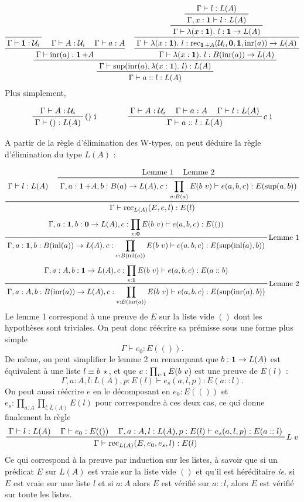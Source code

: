 \documentclass[../../rapport.tex]{subfiles}
\begin{document}
  $$
    \prfinterspace=1.2em
    \prftree
      {\prftree
	{\prftree
	  {\prfaxiom{\Gamma \vdash \1 : \U_i}}
	  {\Gamma \vdash A : \U_i}
	  {\Gamma \vdash a : A}
	{\Gamma \vdash \inr(a) : \1 + A}}
	{\prftree
	  {\prftree
	    {\prftree
	      {\prftree
		{\Gamma \vdash l : L(A)}
	      {\Gamma, x : \1 \vdash l : L(A)}}
	    {\Gamma \vdash \lambda(x:\1).\ l : \1 \fun L(A)}}
	  {\Gamma \vdash \lambda(x:\1).\ l : \rec_{\1 + A}(\U_i, \0, \1, \inr(a)) \fun L(A)}}
	{\Gamma \vdash \lambda(x:\1).\ l : B(\inr(a)) \fun L(A)}}
      {\Gamma \vdash \sup(\inr(a), \lambda(x:\1).\ l) : L(A)}}
    {\Gamma \vdash a :: l : L(A)}
  $$
  Plus simplement,

  $$\prfinterspace=1.2em
  \begin{array}{cc}
    \prftree[r]{$()$ i}{\Gamma \vdash A : \U_i}{\Gamma \vdash () : L(A)} \hspace{1cm}
    & \prftree[r]{$c$ i}{\Gamma \vdash A : \U_i}{\Gamma \vdash a : A}{\Gamma \vdash l : L(A)}{\Gamma \vdash a :: l : L(A)}
  \end{array}$$

  A partir de la règle d'élimination des W-types, on peut déduire la règle d'élimination du type $L(A)$ :

  $$\prfinterspace=1.2em
  \prftree
    {\Gamma \vdash l : L(A)}
    {\prftree
      {\text{Lemme 1}}
      {\text{Lemme 2}}
    {\Gamma, a : \1 + A, b : B(a) \fun L(A), c : \prod_{v:B(a)}E(b\ v) \vdash e(a, b, c) : E(\sup(a, b))}}
  {\Gamma \vdash \rec_{L(A)}(E, e, l) : E(l)}
  \vspace{1em}
  $$
  $$\prfinterspace=1.2em
  \prftree[r]{Lemme 1}
    {\Gamma, a : \1, b : \0 \fun L(A), c : \prod_{v:\0}E(b\ v) \vdash e(a, b, c) : E(())}
  {\Gamma, a : \1, b : B(\inl(a)) \fun L(A), c : \prod_{v:B(\inl(a))}E(b\ v) \vdash e(a, b, c) : E(\sup(\inl(a), b))}
  \vspace{1em}
  $$
  $$\prfinterspace=1.2em
  \prftree[r]{Lemme 2}
    {\Gamma, a : A, b : \1 \fun L(A), c : \prod_{v: \1}E(b\ v) \vdash e(a, b, c) : E(a :: b)}
  {\Gamma, a : A, b : B(\inr(a)) \fun L(A), c : \prod_{v:B(\inr(a))}E(b\ v) \vdash e(a, b, c) : E(\sup(\inr(a), b))}
  $$
  Le lemme 1 correspond à une preuve de $E$ sur la liste vide $()$ dont les hypothèses sont triviales.
  On peut donc réécrire sa prémisse sous une forme plus simple
  $$\Gamma \vdash e_0 : E(()).$$
  De même, on peut simplifier le lemme 2 en remarquant que $b : \operatorname{\textbf{1}} \rightarrow L(A)$ est équivalent à une liste $l \equiv b\ \star$,
  et que $c : \prod_{v:\operatorname{\textbf{1}}}E(b\ v)$ est une preuve de $E(l)$ :
  $$\Gamma, a : A, l : L(A), p : E(l) \vdash e_s(a, l, p) : E(a :: l).$$
  On peut aussi réécrire $e$ en le décomposant en $e_0 : E(())$ et $e_s : \prod_{a:A}\prod_{l:L(A)}E(l)$
  pour correspondre à ces deux cas, ce qui donne finalement la règle
  $$
  \prfinterspace=1.2em
  \prftree[r]{$L$ e}
    {\Gamma \vdash l : L(A)}
    {\Gamma \vdash e_0 : E(())}
    {\Gamma, a : A, l : L(A), p : E(l) \vdash e_s(a, l, p) : E(a :: l)}
  {\Gamma \vdash \rec_{L(A)}(E, e_0, e_s, l) : E(l)}
  $$
  Ce qui correspond à la preuve par induction sur les listes, à savoir que si un prédicat $E$ sur $L(A)$ est vraie
  sur la liste vide $()$ et qu'il est héréditaire \textit{ie.} si $E$ est vraie sur une liste $l$ et si $a : A$
  alors $E$ est vérifié sur $a :: l$, alors $E$ est vérifié sur toute les listes.
\end{document}
